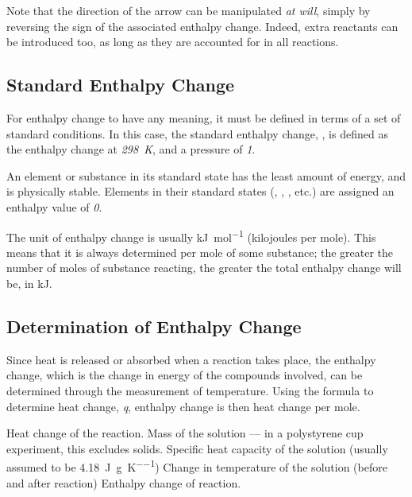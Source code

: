 		Note that the direction of the arrow can be manipulated \textit{at will}, simply by reversing the sign of the associated enthalpy
		change. Indeed, extra reactants can be introduced too, as long as they are accounted for in all reactions.


	\subsection{Standard Enthalpy Change}

		For enthalpy change to have any meaning, it must be defined in terms of a set of standard conditions. In this case, the standard
		enthalpy change, \enthStd{}, is defined as the enthalpy change at \textit{\SI{298}{\kelvin}}, and a pressure of \textit{\SI{1}{\atm}}.

		An element or substance in its standard state has the least amount of energy, and is physically stable. Elements in their standard
		states (, , , etc.) are assigned an enthalpy value of \textit{0}.

		The unit of enthalpy change is usually \si{\kilo\joule\per\mole} (kilojoules per mole). This means that it is always determined
		per mole of some substance; the greater the number of moles of substance reacting, the greater the total enthalpy change will be,
		in \si{\kilo\joule}.


	\pagebreak
	\subsection{Determination of Enthalpy Change}

		Since heat is released or absorbed when a reaction takes place, the enthalpy change, which is the change in energy of the compounds
		involved, can be determined through the measurement of temperature. Using the formula to determine heat change, \textit{q}, enthalpy change
		is then heat change per mole.


		\vbox{
			\tabto{0mm}\tabto{15mm}	Heat change of the reaction.
			\tabto{0mm}\tabto{15mm}	Mass of the solution — in a polystyrene cup experiment, this excludes solids.
			\tabto{0mm}\tabto{15mm}	Specific heat capacity of the solution (usually assumed to be \SI{4.18}{\joule\per\gram\per\kelvin})
			\tabto{0mm}\tabto{15mm}Change in temperature of the solution (before and after reaction)
			\tabto{0mm}\tabto{15mm}Enthalpy change of reaction.
		}

